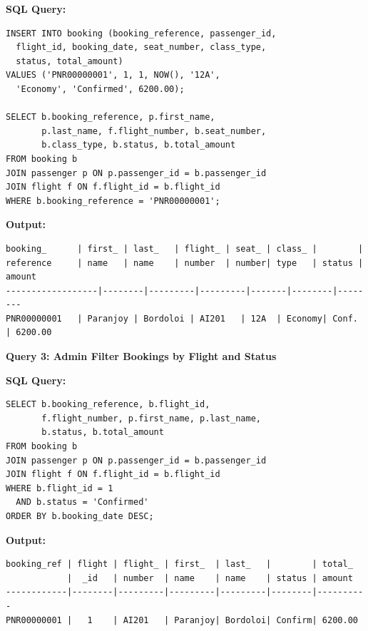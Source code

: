 \documentclass[12pt, a4paper]{article}
\begin{document}
\noindent\begin{minipage}[t]{0.48\textwidth}
\textbf{SQL Query:}
\begin{lstlisting}[style=sqlstyle,basicstyle=\tiny\ttfamily,showstringspaces=false]
INSERT INTO booking (booking_reference, passenger_id, 
  flight_id, booking_date, seat_number, class_type, 
  status, total_amount) 
VALUES ('PNR00000001', 1, 1, NOW(), '12A', 
  'Economy', 'Confirmed', 6200.00);

SELECT b.booking_reference, p.first_name, 
       p.last_name, f.flight_number, b.seat_number,
       b.class_type, b.status, b.total_amount
FROM booking b
JOIN passenger p ON p.passenger_id = b.passenger_id
JOIN flight f ON f.flight_id = b.flight_id
WHERE b.booking_reference = 'PNR00000001';
\end{lstlisting}
\end{minipage}\hfill
\begin{minipage}[t]{0.48\textwidth}
\textbf{Output:}
\begin{lstlisting}[style=sqlstyle,basicstyle=\tiny\ttfamily,showstringspaces=false]
booking_      | first_ | last_   | flight_ | seat_ | class_ |        |
reference     | name   | name    | number  | number| type   | status | amount
------------------|--------|---------|---------|-------|--------|--------
PNR00000001   | Paranjoy | Bordoloi | AI201   | 12A  | Economy| Conf.  | 6200.00
\end{lstlisting}
\end{minipage}

\vspace{0.3cm}

\textbf{Query 3: Admin Filter Bookings by Flight and Status}

\noindent\begin{minipage}[t]{0.48\textwidth}
\textbf{SQL Query:}
\begin{lstlisting}[style=sqlstyle,basicstyle=\tiny\ttfamily,showstringspaces=false]
SELECT b.booking_reference, b.flight_id, 
       f.flight_number, p.first_name, p.last_name,
       b.status, b.total_amount
FROM booking b
JOIN passenger p ON p.passenger_id = b.passenger_id
JOIN flight f ON f.flight_id = b.flight_id
WHERE b.flight_id = 1 
  AND b.status = 'Confirmed'
ORDER BY b.booking_date DESC;
\end{lstlisting}
\end{minipage}\hfill
\begin{minipage}[t]{0.48\textwidth}
\textbf{Output:}
\begin{lstlisting}[style=sqlstyle,basicstyle=\tiny\ttfamily,showstringspaces=false]
booking_ref | flight | flight_ | first_  | last_   |        | total_
            |  _id   | number  | name    | name    | status | amount
------------|--------|---------|---------|---------|--------|----------
PNR00000001 |   1    | AI201   | Paranjoy| Bordoloi| Confirm| 6200.00
\end{lstlisting}
\end{minipage}
\end{document}
